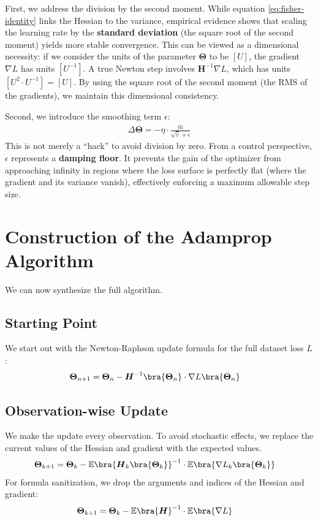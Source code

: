 First, we address the division by the second moment. While equation \eqref{eq:fisher-identity} links the Hessian to the variance, empirical evidence shows that scaling the learning rate by the \textbf{standard deviation} (the square root of the second moment) yields more stable convergence. This can be viewed as a dimensional necessity: if we consider the units of the parameter $\boldsymbol{\Theta}$ to be $[U]$, the gradient $\nabla L$ has units $[U^{-1}]$. A true Newton step involves $\boldsymbol{H}^{-1}\nabla L$, which has units $[U^2 \cdot U^{-1}] = [U]$. By using the square root of the second moment (the RMS of the gradients), we maintain this dimensional consistency.

Second, we introduce the smoothing term $\epsilon$:
\begin{align}
	\Delta \boldsymbol{\Theta} = - \eta \cdot \frac{\hat{m}}{\sqrt{\hat{v}} + \epsilon}
\end{align}
This is not merely a \enquote{hack} to avoid division by zero. From a control perspective, $\epsilon$ represents a \textbf{damping floor}. It prevents the gain of the optimizer from approaching infinity in regions where the loss surface is perfectly flat (where the gradient and its variance vanish), effectively enforcing a maximum allowable step size.

\section{Construction of the Adamprop Algorithm}
We can now synthesize the full algorithm.

\subsection*{Starting Point}
We start out with the Newton-Raphson update formula for the full dataset loss $L$:
\begin{align}
	\boldsymbol{\Theta}_{n+1}&=\boldsymbol{\Theta}_{n} - \boldsymbol{H}^{-1}\bra{\boldsymbol{\Theta}_n}\cdot\nabla L\bra{\boldsymbol{\Theta}_n}
\end{align}

\subsection*{Observation-wise Update}
We make the update every observation. To avoid stochastic effects, we replace the current values of the Hessian and gradient with the expected values.
\begin{align}
	\boldsymbol{\Theta}_{k+1}&=\boldsymbol{\Theta}_{k} - \mathbb{E}\bra{\boldsymbol{H}_k\bra{\boldsymbol{\Theta}_k}}^{-1}\cdot\mathbb{E}\bra{\nabla L_k\bra{\boldsymbol{\Theta}_k}}
\end{align}
For formula sanitization, we drop the arguments and indices of the Hessian and gradient:
\begin{align}
	\boldsymbol{\Theta}_{k+1}&=\boldsymbol{\Theta}_{k} - \mathbb{E}\bra{\boldsymbol{H}}^{-1}\cdot\mathbb{E}\bra{\nabla L}
\end{align}

